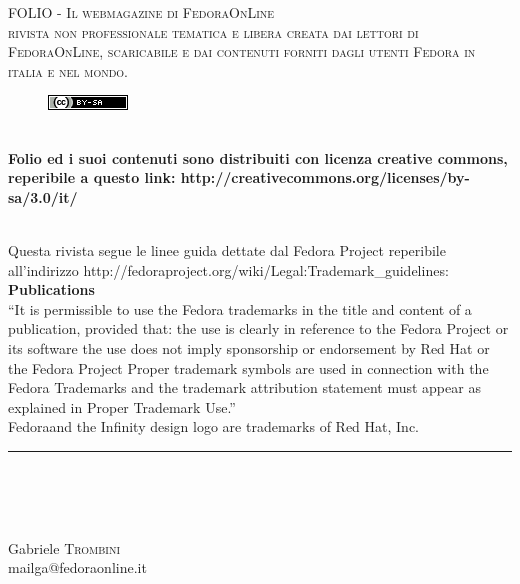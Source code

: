 \begin{titlepage}
\thispagestyle{empty}
\doublespacing
\textsc{\LARGE FOLIO - Il webmagazine di FedoraOnLine}\\[1.0cm]
\textsc{\Large rivista non professionale tematica e libera creata dai lettori di FedoraOnLine, scaricabile e dai contenuti forniti dagli utenti Fedora in italia e nel mondo.}\\[0.5cm]
\begin{figure}[htbp]
\centering
\includegraphics[scale=1.0]{immagini/logo/cc.png}
\end{figure}\\
{\bfseries Folio ed i suoi contenuti sono distribuiti con licenza creative commons, reperibile a questo link: http://creativecommons.org/licenses/by-sa/3.0/it/ }\\[0.4cm]
{\doublespacing\\}
\begin{tiny}
\begin{spacing}{1.0}
Questa rivista segue le linee guida dettate dal Fedora Project reperibile all'indirizzo  http://fedoraproject.org/wiki/Legal:Trademark\_guidelines:\\
{\bfseries Publications}\\
``It is permissible to use the Fedora trademarks in the title and content of a publication, provided that:
    the use is clearly in reference to the Fedora Project or its software
    the use does not imply sponsorship or endorsement by Red Hat or the Fedora Project
    Proper trademark symbols are used in connection with the Fedora Trademarks and the trademark attribution statement must appear as explained in Proper Trademark Use.'' \\
Fedora\textregistered and the Infinity design logo are trademarks of Red Hat, Inc.
\end{spacing}
\end{tiny}
\rule{\textwidth}{0.5mm}\\
{\doublespacing\\}
\vfill
\noindent
\begin{minipage}{0.4\textwidth}
\begin{flushleft} 
\singlespacing
\large
{\bfseries{}}\\
\bigskip
Gabriele \textsc{Trombini}\\
{\tiny mailga@fedoraonline.it} \\

\end{flushleft}
\end{minipage}
\end{titlepage}
